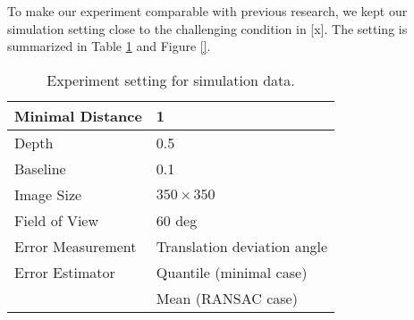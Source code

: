 \documentclass[letterpaper, 10 pt, conference]{ieeeconf}
\begin{document}
To make our experiment comparable with previous research, we kept our simulation setting close to the challenging condition in [x]. The setting is summarized in Table \ref{SettingTable} and Figure \ref{}. 
\begin{table}
\caption{Experiment setting for simulation data. }
\begin{center}
\begin{tabular}{|l|l|}
	\hline	
	Minimal Distance & 1 \\
	\hline
	Depth & 0.5 \\
	\hline
	Baseline & 0.1 \\
	\hline
	Image Size & $350 \times 350$ \\ 
	\hline	
	Field of View & 60 deg \\
	\hline	
	Error Measurement & Translation deviation angle \\ 
	\hline	
	Error Estimator & Quantile (minimal case) \\
	& Mean (RANSAC case) \\
	\hline	
\end{tabular} 
\end{center}
\label{SettingTable}
\end{table}
\end{document}
